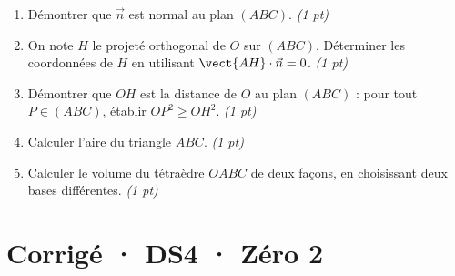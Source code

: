 \begin{enumerate}

\item Démontrer que $\vec n$ est normal au plan $(ABC)$. \hfill\textit{(1 pt)}

\item On note $H$ le projeté orthogonal de $O$ sur $(ABC)$. Déterminer les coordonnées de $H$ en utilisant $\vect{AH}\cdot\vec n=0$. \hfill\textit{(1 pt)}

\item Démontrer que $OH$ est la distance de $O$ au plan $(ABC)$ : pour tout $P\in(ABC)$, établir $OP^2\ge OH^2$. \hfill\textit{(1 pt)}

\item Calculer l'aire du triangle $ABC$. \hfill\textit{(1 pt)}

\item Calculer le volume du tétraèdre $OABC$ de deux façons, en choisissant deux bases différentes. \hfill\textit{(1 pt)}

\end{enumerate}

\ifprof\clearpage

\section*{Corrigé · DS4 · Zéro 2}\label{cor:6-2}

